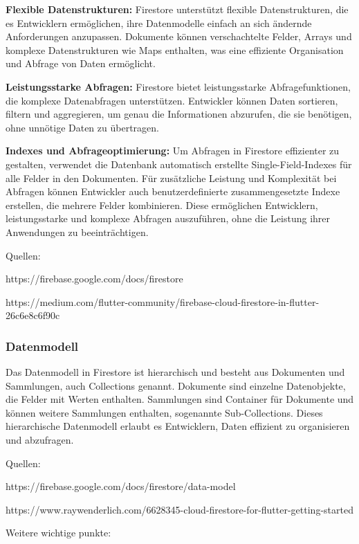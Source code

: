 \textbf{Flexible Datenstrukturen:} Firestore unterstützt flexible Datenstrukturen, die es Entwicklern ermöglichen, ihre Datenmodelle einfach an sich ändernde Anforderungen anzupassen. Dokumente können verschachtelte Felder, Arrays und komplexe Datenstrukturen wie Maps enthalten, was eine effiziente Organisation und Abfrage von Daten ermöglicht.

\textbf{Leistungsstarke Abfragen:} Firestore bietet leistungsstarke Abfragefunktionen, die komplexe Datenabfragen unterstützen. Entwickler können Daten sortieren, filtern und aggregieren, um genau die Informationen abzurufen, die sie benötigen, ohne unnötige Daten zu übertragen.

\textbf{Indexes und Abfrageoptimierung:} Um Abfragen in Firestore effizienter zu gestalten, verwendet die Datenbank automatisch erstellte Single-Field-Indexes für alle Felder in den Dokumenten. Für zusätzliche Leistung und Komplexität bei Abfragen können Entwickler auch benutzerdefinierte zusammengesetzte Indexe erstellen, die mehrere Felder kombinieren. Diese ermöglichen Entwicklern, leistungsstarke und komplexe Abfragen auszuführen, ohne die Leistung ihrer Anwendungen zu beeinträchtigen.





Quellen:

https://firebase.google.com/docs/firestore

https://medium.com/flutter-community/firebase-cloud-firestore-in-flutter-26c6e8c6f90c



\subsubsection{Datenmodell}

Das Datenmodell in Firestore ist hierarchisch und besteht aus Dokumenten und Sammlungen, auch Collections genannt. Dokumente sind einzelne Datenobjekte, die Felder mit Werten enthalten. Sammlungen sind Container für Dokumente und können weitere Sammlungen enthalten, sogenannte Sub-Collections. Dieses hierarchische Datenmodell erlaubt es Entwicklern, Daten effizient zu organisieren und abzufragen.

Quellen:

https://firebase.google.com/docs/firestore/data-model

https://www.raywenderlich.com/6628345-cloud-firestore-for-flutter-getting-started

Weitere wichtige punkte:


